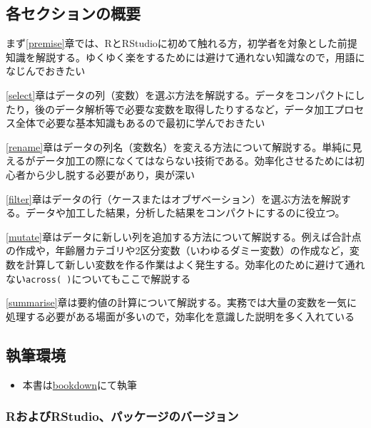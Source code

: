 \documentclass[
  xelatex,ja=standard, b5paper]{bxjsbook}
\providecommand{\tightlist}{%
  \setlength{\itemsep}{0pt}\setlength{\parskip}{0pt}}
\begin{document}
\hypertarget{ux5404ux30bbux30afux30b7ux30e7ux30f3ux306eux6982ux8981}{%
\subsection*{各セクションの概要}\label{ux5404ux30bbux30afux30b7ux30e7ux30f3ux306eux6982ux8981}}

まず\ref{premise}章では、RとRStudioに初めて触れる方，初学者を対象とした前提知識を解説する。ゆくゆく楽をするためには避けて通れない知識なので，用語になじんでおきたい

\ref{select}章はデータの列（変数）を選ぶ方法を解説する。データをコンパクトにしたり，後のデータ解析等で必要な変数を取得したりするなど，データ加工プロセス全体で必要な基本知識もあるので最初に学んでおきたい

\ref{rename}章はデータの列名（変数名）を変える方法について解説する。単純に見えるがデータ加工の際になくてはならない技術である。効率化させるためには初心者から少し脱する必要があり，奥が深い

\ref{filter}章はデータの行（ケースまたはオブザベーション）を選ぶ方法を解説する。データや加工した結果，分析した結果をコンパクトにするのに役立つ。

\ref{mutate}章はデータに新しい列を追加する方法について解説する。例えば合計点の作成や，年齢層カテゴリや2区分変数（いわゆるダミー変数）の作成など，変数を計算して新しい変数を作る作業はよく発生する。効率化のために避けて通れない\texttt{across(\ )}についてもここで解説する

\ref{summarise}章は要約値の計算について解説する。実務では大量の変数を一気に処理する必要がある場面が多いので，効率化を意識した説明を多く入れている

\hypertarget{ux57f7ux7b46ux74b0ux5883}{%
\subsection*{執筆環境}\label{ux57f7ux7b46ux74b0ux5883}}

\begin{itemize}
\tightlist
\item
  本書は\href{https://bookdown.org/}{bookdown}にて執筆
\end{itemize}

\hypertarget{rux304aux3088ux3073rstudioux30d1ux30c3ux30b1ux30fcux30b8ux306eux30d0ux30fcux30b8ux30e7ux30f3}{%
\subsubsection*{RおよびRStudio、パッケージのバージョン}\label{rux304aux3088ux3073rstudioux30d1ux30c3ux30b1ux30fcux30b8ux306eux30d0ux30fcux30b8ux30e7ux30f3}}
\end{document}
